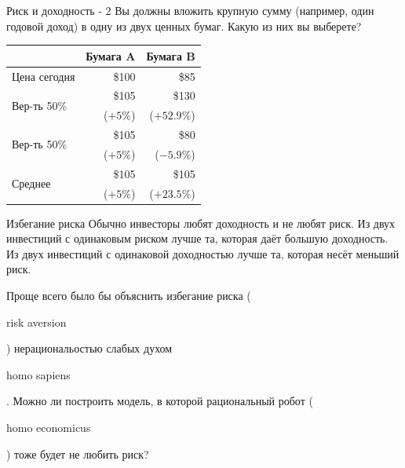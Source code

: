 \documentclass{beamer}
\newcommand{\qrcodeminipage}[1]{
	\begin{minipage}{0.3\textwidth}
		\qrcode[height=\textwidth]{#1}
	\end{minipage}
}
\newcommand{\en}[1]{\begin{otherlanguage}{english}#1\end{otherlanguage}}
\begin{document}
\begin{frame}{Риск и доходность - 2}
\justify
Вы должны вложить крупную сумму (например, один годовой доход) в одну из двух ценных бумаг. Какую из них вы выберете?

\justify
\centering
\begin{minipage}[t]{0.6\textwidth}
	\begin{tabular}{l|r|r}
	                              & Бумага A & Бумага B     \\ \hline
	Цена сегодня                  & \$100    & \alert{\$85} \\ \hline
	\multirow{2}{*}{Вер-ть 50\%}  & \$105    & \$130        \\ 
	                              & ($+5\%$) & ($+52.9\%$)  \\ \hline
	\multirow{2}{*}{Вер-ть 50\%}  & \$105    & \$80         \\
	                              & ($+5\%$) & ($-5.9\%$)  \\ \hline
	\multirow{2}{*}{Среднее}      & \$105    & \$105        \\
	                              & ($+5\%$) & (\alert{$+23.5\%$})
	\end{tabular}
\end{minipage}
\end{frame}



\begin{frame}{Избегание риска}
\justify
Обычно инвесторы любят доходность и не любят риск. Из двух инвестиций с 
одинаковым риском лучше та, которая даёт большую доходность. Из двух инвестиций 
с одинаковой доходностью лучше та, которая несёт меньший риск.

\justify
Проще всего было бы объяснить избегание риска (\en{risk aversion}) 
нерациональостью слабых духом \en{homo sapiens}. Можно ли построить модель, в
которой рациональный робот (\en{homo economicus}) тоже будет не любить риск?
\end{frame}
\end{document}

